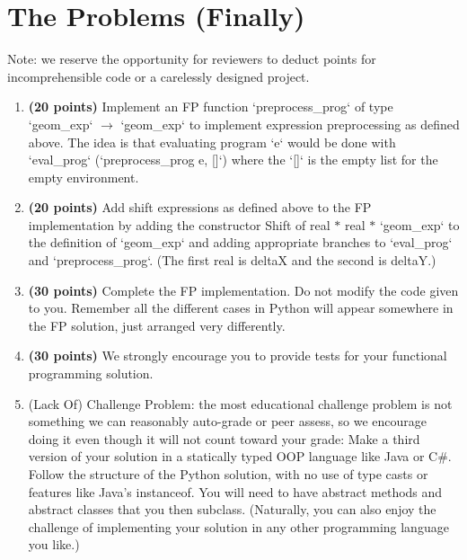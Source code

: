 \documentclass[a4paper,12pt]{article}
\begin{document}
\section*{The Problems (Finally)}
Note: we reserve the opportunity for reviewers to deduct points for incomprehensible code or a carelessly designed project.
\begin{enumerate}
  \item \textbf{(20 points)} Implement an FP function `preprocess\_prog` of type `geom\_exp` $\rightarrow$ `geom\_exp` to implement expression preprocessing as defined above. The idea is that evaluating program `e` would be done with `eval\_prog` (`preprocess\_prog e, []`) where the `[]` is the empty list for the empty environment.

  \item \textbf{(20 points)} Add shift expressions as defined above to the FP implementation by adding the constructor Shift of real $*$ real $*$ `geom\_exp` to the definition of `geom\_exp` and adding appropriate branches to `eval\_prog` and `preprocess\_prog`. (The first real is deltaX and the second is deltaY.)

  \item \textbf{(30 points)} Complete the FP implementation. Do not modify the code given to you. Remember all the different cases in Python will appear somewhere in the FP solution, just arranged very differently.

  \item \textbf{(30 points)} We strongly encourage you to provide tests for your functional programming solution.

  \item (Lack Of) Challenge Problem: the most educational challenge problem is not something we can reasonably auto-grade or peer assess,
  so we encourage doing it even though it will not count toward your grade: Make a third version of your solution in a statically typed OOP language like Java or C\#. Follow the structure of the Python solution, with no use of type casts or features like Java's instanceof. You will need to have abstract methods and abstract classes that you then subclass. (Naturally, you can also enjoy the challenge of implementing your solution in any other programming language you like.)
\end{enumerate}
\end{document}
